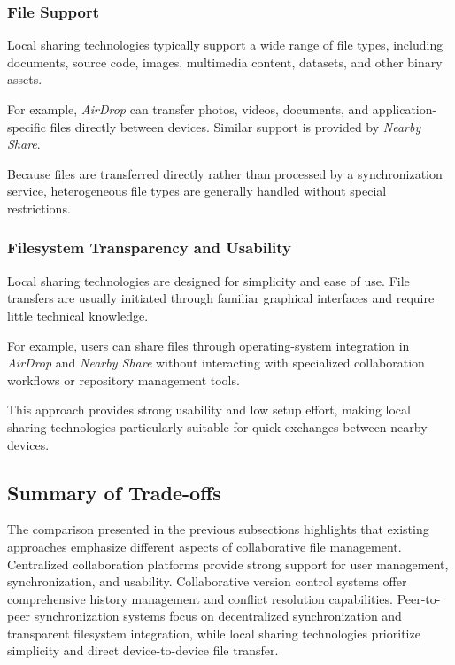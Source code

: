 \subsubsection{File Support}

Local sharing technologies typically support a wide range of
file types, including documents, source code, images,
multimedia content, datasets, and other binary assets.

For example, \textit{AirDrop} can transfer photos, videos,
documents, and application-specific files directly between
devices. Similar support is provided by \textit{Nearby Share}.

Because files are transferred directly rather than processed by
a synchronization service, heterogeneous file types are
generally handled without special restrictions.

\subsubsection{Filesystem Transparency and Usability}

Local sharing technologies are designed for simplicity and ease
of use. File transfers are usually initiated through familiar
graphical interfaces and require little technical knowledge.

For example, users can share files through operating-system
integration in \textit{AirDrop} and \textit{Nearby Share}
without interacting with specialized collaboration workflows or
repository management tools.

This approach provides strong usability and low setup effort,
making local sharing technologies particularly suitable for
quick exchanges between nearby devices.

\subsection{Summary of Trade-offs}
%
%
%
%

The comparison presented in the previous subsections highlights
that existing approaches emphasize different aspects of
collaborative file management. Centralized collaboration
platforms provide strong support for user management,
synchronization, and usability. Collaborative version control
systems offer comprehensive history management and conflict
resolution capabilities. Peer-to-peer synchronization systems
focus on decentralized synchronization and transparent
filesystem integration, while local sharing technologies
prioritize simplicity and direct device-to-device file
transfer.

